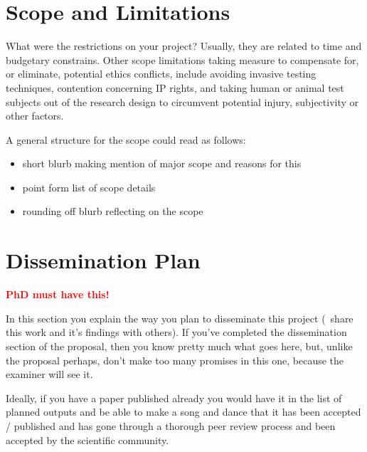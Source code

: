 

\section{Scope and Limitations}

What were the restrictions on your project?  Usually, they are related to time and budgetary constrains.  Other scope limitations taking measure to compensate for, or eliminate, potential ethics conflicts, include avoiding invasive testing techniques, contention concerning IP rights, and taking human or animal test subjects out of the research design to circumvent potential injury, subjectivity or other factors.

A general structure for the scope could read as follows:

\begin{itemize}
  \item short blurb making mention of major scope and reasons for this
  \item point form list of scope details
  \item rounding off blurb reflecting on the scope
\end{itemize}

\section{Dissemination Plan}

\textbf{\textcolor{red}{PhD must have this!}}

In this section you explain the way you plan to disseminate this project (\ie~share this work and it's findings with others). If you've completed the dissemination section of the proposal, then you know pretty much what goes here, but, unlike the proposal perhaps, don't make too many promises in this one, because the examiner will see it.

Ideally, if you have a paper published already you would have it in the list of planned outputs and be able to make a song and dance that it has been accepted / published and has gone through a thorough peer review process and been accepted by the scientific community.

